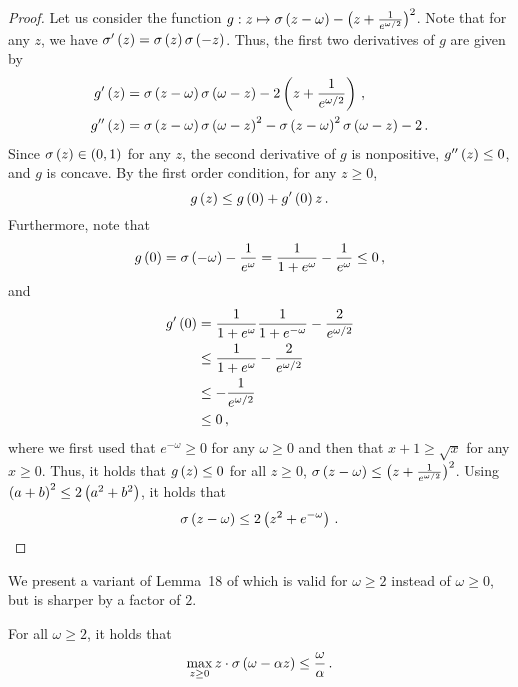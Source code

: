 \begin{proof}
  Let us consider the function $g: z \mapsto \sigma \left( z - \omega \right) - \left( z + \frac{1}{e^{\omega/2}} \right)^2$. Note that for any $z$, we have $\sigma' \left( z \right) = \sigma \left( z \right) \sigma \left( - z \right)$. Thus, the first two derivatives of $g$ are given by
  \begin{align*}
    g' \left( z \right) &= \sigma \left( z - \omega \right) \sigma \left( \omega - z \right) - 2 \left( z + \frac{1}{e^{\omega / 2}} \right)\,, \\
    g'' \left( z \right) &= \sigma \left( z - \omega \right) \sigma \left( \omega - z \right)^2 - \sigma \left( z - \omega \right)^2 \sigma \left( \omega - z \right) - 2 \,.
  \end{align*}
  Since $\sigma \left( z \right) \in \left( 0, 1 \right)$ for any $z$, the second derivative of $g$ is nonpositive, $g'' \left( z \right) \leq 0$, and $g$ is concave. By the first order condition, for any $z \geq 0$,
  \begin{equation*}
    g \left( z \right) \leq g \left( 0 \right) + g' \left( 0 \right) z\,.
  \end{equation*}
  Furthermore, note that
  \begin{equation*}
    g \left( 0 \right) = \sigma \left( - \omega \right) - \frac{1}{e^\omega} = \frac{1}{1 + e^\omega} - \frac{1}{e^\omega} \leq 0\,,
  \end{equation*}
  and
  \begin{align*}
    g' \left( 0 \right) &= \frac{1}{1 + e^\omega} \frac{1}{1 + e^{- \omega}} - \frac{2}{e^{\omega / 2}} \\
    &\leq \frac{1}{1 + e^\omega} - \frac{2}{e^{\omega / 2}} \\
    &\leq - \frac{1}{e^{\omega / 2}} \\
    &\leq 0\,,
  \end{align*}
  where we first used that $e^{- \omega} \geq 0$ for any $\omega \geq 0$ and then that $x + 1 \geq \sqrt{x}$ for any $x \geq 0$. Thus, it holds that $g \left( z \right) \leq 0$ for all $z \geq 0$, \ie $\sigma \left( z - \omega \right) \leq \left( z + \frac{1}{e^{\omega / 2}} \right)^2$. Using $\left( a+b \right)^2 \leq 2 \left( a^2 + b^2 \right)$, it holds that
  \begin{equation*}
    \sigma \left( z - \omega \right) \leq 2 \left( z^2 + e^{- \omega} \right)\,.
  \end{equation*}
\end{proof}

We present a variant of Lemma~18 of \citet{cassel2024warmupfree} which is valid for $\omega \geq 2$ instead of $\omega \geq 0$, but is sharper by a factor of $2$.
%
\begin{lemma} \label{lem:sigmoid-bound2}
  For all $\omega \geq 2$, it holds that
  \begin{equation*}
    \max_{z \geq 0} z \cdot \sigma \left( \omega - \alpha z \right) \leq \frac{\omega}{\alpha}\,.
  \end{equation*}
\end{lemma}

